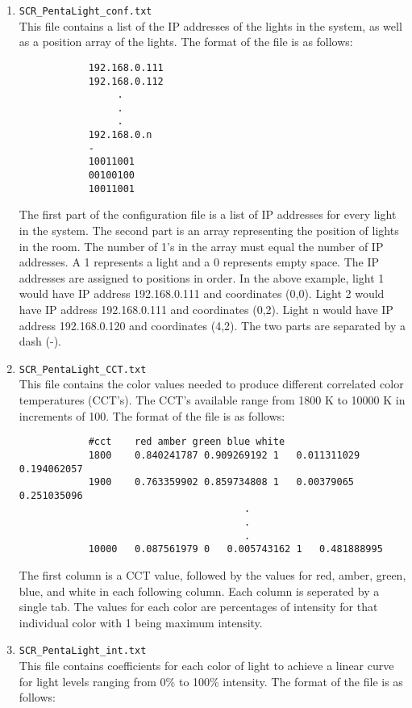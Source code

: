 \documentclass[twoside]{article}
\begin{document}
	\begin{enumerate}
		\item \verb|SCR_PentaLight_conf.txt|\\
		This file contains a list of the IP addresses of the lights in the system, as well as a position array of the lights. The format of the file is as follows:
		
		\begin{verbatim}
		    192.168.0.111
		    192.168.0.112
		         .
		         .
		         .
		    192.168.0.n
		    -
		    10011001
		    00100100
		    10011001
		\end{verbatim}
		
		The first part of the configuration file is a list of IP addresses for every light in the system. The second part is an array representing the position of lights in the room. The number of 1's in the array must equal the number of IP addresses. A 1 represents a light and a 0 represents empty space. The IP addresses are assigned to positions in order. In the above example, light 1 would have IP address 192.168.0.111 and coordinates (0,0). Light 2 would have IP address 192.168.0.111 and coordinates (0,2). Light n would have IP address 192.168.0.120 and coordinates (4,2). The two parts are separated by a dash (-). 
		
		\item \verb|SCR_PentaLight_CCT.txt|\\
		This file contains the color values needed to produce different correlated color temperatures (CCT's). The CCT's available range from 1800 K to 10000 K in increments of 100. The format of the file is as follows:
		
		\begin{verbatim}
		    #cct    red amber green blue white
		    1800	0.840241787	0.909269192	1	0.011311029	0.194062057
		    1900	0.763359902	0.859734808	1	0.00379065	0.251035096
			                           .
			                           .
			                           .
		    10000	0.087561979	0	0.005743162	1	0.481888995
		\end{verbatim}
		
		The first column is a CCT value, followed by the values for red, amber, green, blue, and 
		white in each following column. Each column is seperated by a single tab. The values for each color are percentages of intensity for that individual color with 1 being maximum intensity.
		
		\item \verb|SCR_PentaLight_int.txt|\\
		This file contains coefficients for each color of light to achieve a linear curve for light levels ranging from 0\% to 100\% intensity. The format of the file is as follows:
		

\end{enumerate}
\end{document}
